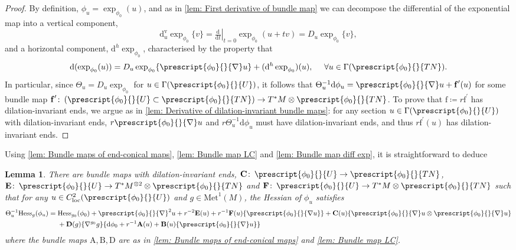 \documentclass{article}
\numberwithin{equation}{section}        %
\theoremstyle{bfnote}
\newtheorem{lem}[thm]{Lemma}                %
\theoremstyle{definition}
\theoremstyle{bfremark}
\newcommand{\col}{\colon \thinspace}        %
\newcommand{\Met}{\mathrm{Met}}             %
\newcommand{\diff}{\mathrm{d}}                      %
\newcommand{\bmap}[1]{\boldsymbol{\mathrm{#1}}}     %
\begin{document}
\begin{proof}
    By definition, $\phi_u = \exp_{\phi_0}(u)$, and as in \cref{lem: First derivative of bundle map} we can decompose the differential of the exponential map into a vertical component, 
    \begin{equation*}
        \diff^{\mathrm{v}}_u \exp_{\phi_0}\{v\} = \left. \tfrac{\diff}{\diff t} \right|_{t = 0} \exp_{\phi_0}(u+tv) = D_u \exp_{\phi_0} \{v\},
    \end{equation*} 
    and a horizontal component, $\diff^h \exp_{\phi_0}$, characterised by the property that
    \begin{equation*}
        \diff (\exp_{\phi_0}(u)) = D_u \exp_{\phi_0} \{\prescript{\phi_0}{}{\nabla} u\} + (\diff^h \exp_{\phi_0})(u), ~~~~ \forall u \in \Gamma(\prescript{\phi_0}{}{TN}) .
    \end{equation*}
    In particular, since $\Theta_u = D_u \exp_{\phi_0}$ for $u \in \Gamma(\prescript{\phi_0}{}{U})$, it follows that $\Theta_u^{-1} \diff \phi_u = \prescript{\phi_0}{}{\nabla} u + \bmap{f}^\prime(u)$ for some bundle map $\bmap{f}^\prime \col (\prescript{\phi_0}{}{U} \subset \prescript{\phi_0}{}{TN}) \to T^*M \otimes \prescript{\phi_0}{}{TN}$. To prove that $\bmap{f} \coloneqq r\bmap{f}^\prime$ has dilation-invariant ends, we argue as in \cref{lem: Derivative of dilation-invariant bundle maps}: for any section $u \in \Gamma(\prescript{\phi_0}{}{U})$ with dilation-invariant ends, $r \prescript{\phi_0}{}{\nabla} u$ and $r \Theta_u^{-1} \diff \phi_u$ must have dilation-invariant ends, and thus $r \bmap{f}^\prime(u)$ has dilation-invariant ends.
\end{proof}

Using \cref{lem: Bundle maps of end-conical maps}, \cref{lem: Bundle map LC} and \cref{lem: Bundle map diff exp}, it is straightforward to deduce

\begin{lem}     \label{lem: Expression of the Hessian}
    There are bundle maps with dilation-invariant ends, $\bmap{C} \col \prescript{\phi_0}{}{U} \to \prescript{\phi_0}{}{TN}$, $\bmap{E} \col \prescript{\phi_0}{}{U} \to T^*M^{\otimes 2} \otimes \prescript{\phi_0}{}{TN}$ and $\bmap{F} \col \prescript{\phi_0}{}{U} \to T^*M \otimes \prescript{\phi_0}{}{TN}$ such that for any $u \in C^2_{\mathrm{loc}}(\prescript{\phi_0}{}{U})$ and $g \in \Met^1(M)$, the Hessian of $\phi_u$ satisfies
    \begin{align*}
        \Theta_u^{-1} \mathrm{Hess}_g(\phi_u) & = \mathrm{Hess}_{g_0}(\phi_0) + \prescript{\phi_0}{}{\nabla}^2 u + r^{-2} \boldsymbol{\mathrm{E}}(u) + r^{-1} \boldsymbol{\mathrm{F}}(u) \{\prescript{\phi_0}{}{\nabla u}\} + \boldsymbol{\mathrm{C}}(u) \{\prescript{\phi_0}{}{\nabla}u \otimes \prescript{\phi_0}{}{\nabla}u\} \\ 
            & ~~~~ + \boldsymbol{\mathrm{D}}(g) \{\nabla^{g_0} g\} \{ \diff \phi_0 + r^{-1} \boldsymbol{\mathrm{A}}(u) + \boldsymbol{\mathrm{B}}(u) \{ \prescript{\phi_0}{}{\nabla}u\}\}
    \end{align*}
    where the bundle maps $\bmap{A},\bmap{B},\bmap{D}$ are as in \cref{lem: Bundle maps of end-conical maps} and \cref{lem: Bundle map LC}.
\end{lem}
\end{document}
